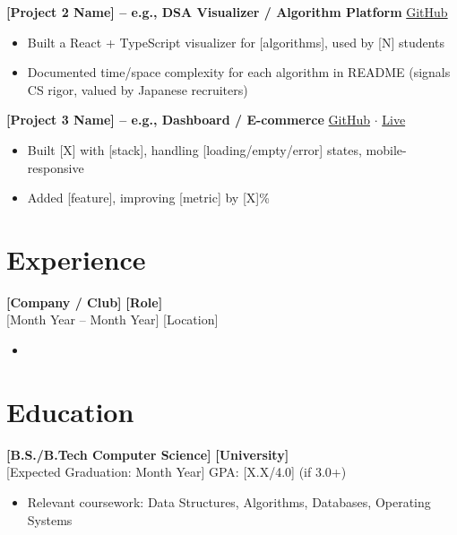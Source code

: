 \documentclass[11pt, letterpaper]{article}
\begin{document}
\textbf{[Project 2 Name] -- e.g., DSA Visualizer / Algorithm Platform} \hfill \small{\href{https://github.com/yourname/p2}{GitHub}} \normalsize\\
\begin{itemize}
  \item Built a React + TypeScript visualizer for [algorithms], used by [N] students
  \item Documented time/space complexity for each algorithm in README (signals CS rigor, valued by Japanese recruiters)
\end{itemize}

\textbf{[Project 3 Name] -- e.g., Dashboard / E-commerce} \hfill \small{\href{https://github.com/yourname/p3}{GitHub} $\cdot$ \href{https://p3.vercel.app}{Live}} \normalsize\\
\begin{itemize}
  \item Built [X] with [stack], handling [loading/empty/error] states, mobile-responsive
  \item Added [feature], improving [metric] by [X]\%
\end{itemize}

\section{Experience}

\textbf{[Company / Club]} \hfill \textbf{[Role]}\\
{[Month Year -- Month Year]} \hfill {[Location]}
\begin{itemize}
  \item [Outcome-focused bullet with metric and tech]
\end{itemize}

\section{Education}
\textbf{[B.S./B.Tech Computer Science]} \hfill \textbf{[University]}\\
{[Expected Graduation: Month Year]} \hfill GPA: {[X.X/4.0]} (if 3.0+)
\begin{itemize}
  \item Relevant coursework: Data Structures, Algorithms, Databases, Operating Systems
\end{itemize}
\end{document}
